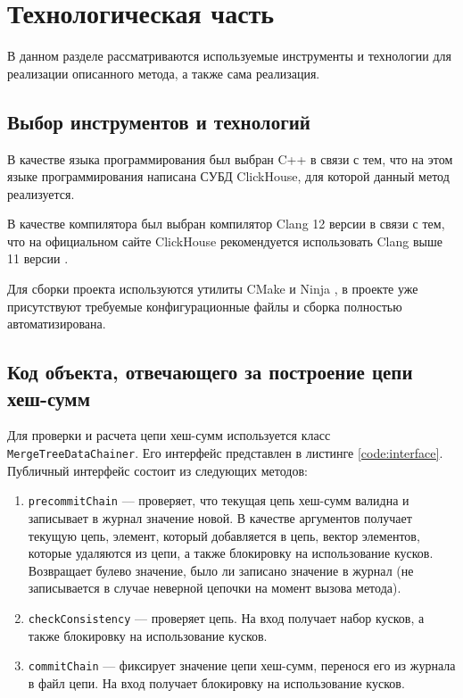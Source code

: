 \section{Технологическая часть}

В данном разделе рассматриваются используемые инструменты и технологии для реализации описанного метода, а также сама реализация.

\subsection{Выбор инструментов и технологий}

В качестве языка программирования был выбран C++ \cite{cpp} в связи с тем, что на этом языке программирования написана СУБД ClickHouse, для которой данный метод реализуется.


В качестве компилятора был выбран компилятор Clang \cite{clang} 12 версии в связи с тем, что на официальном сайте ClickHouse рекомендуется использовать Clang выше 11 версии \cite{chcompiler}.

Для сборки проекта используются утилиты CMake \cite{cmake} и Ninja \cite{ninjabuild}, в проекте уже присутствуют требуемые конфигурационные файлы и сборка полностью автоматизирована.

\subsection{Код объекта, отвечающего за построение цепи хеш-сумм}

Для проверки и расчета цепи хеш-сумм используется класс \\ \texttt{MergeTreeDataChainer}. Его интерфейс представлен в листинге \ref{code:interface}. Публичный интерфейс состоит из следующих методов:
\begin{enumerate}
    \item \texttt{precommitChain} --- проверяет, что текущая цепь хеш-сумм валидна и записывает в журнал значение новой. В качестве аргументов получает текущую цепь, элемент, который добавляется в цепь, вектор элементов, которые удаляются из цепи, а также блокировку на использование кусков. Возвращает булево значение, было ли записано значение в журнал (не записывается в случае неверной цепочки на момент вызова метода).
    \item \texttt{checkConsistency} --- проверяет цепь. На вход получает набор кусков, а также блокировку на использование кусков.
    \item \texttt{commitChain} --- фиксирует значение цепи хеш-сумм, перенося его из журнала в файл цепи. На вход получает блокировку на использование кусков.
\end{enumerate}

